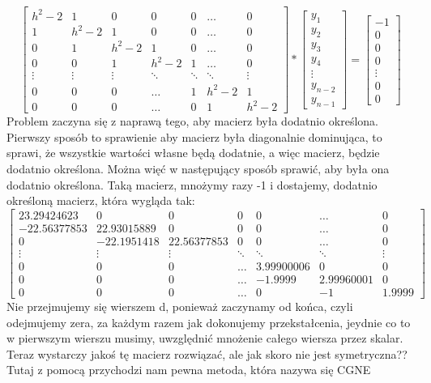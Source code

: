 \documentclass[12pt]{article}
\begin{document}
\[
\begin{bmatrix}
    h^{2}-2 & 1 & 0 & 0 & 0 & \dots & 0\\
    1 & h^{2}-2 & 1 & 0 & 0 & \dots & 0\\ 
    0 & 1 & h^{2}-2 & 1 & 0 & \dots & 0\\
    0 & 0 & 1 & h^{2}-2 & 1 &\dots & 0\\
    \vdots & \vdots & \vdots & \ddots & \ddots & \ddots & \vdots\\
    0 & 0 & 0 & \hdots & 1 & h^{2}-2 & 1\\
    0 & 0 & 0 & \hdots & 0 & 1 & h^{2}-2
\end{bmatrix}
*
\begin{bmatrix}
    y_{1}\\
    y_{2}\\
    y_{3}\\
    y_{4}\\
    \vdots\\
    y_{n-2}\\
    y_{n-1}
\end{bmatrix}
=
\begin{bmatrix}
    -1\\
    0\\
    0\\
    0\\
    \vdots\\
    0\\
    0
\end{bmatrix}
\]
Problem zaczyna się z naprawą tego, aby macierz była dodatnio określona. Pierwszy sposób to sprawienie aby macierz była diagonalnie dominująca, to sprawi, że wszystkie wartości własne będą dodatnie, a więc macierz, będzie dodatnio określona. Można więć w następujący sposób sprawić, aby była ona dodatnio określona. Taką macierz, mnożymy razy -1 i dostajemy, dodatnio określoną macierz, która wygląda tak: 
\[
\begin{bmatrix}
    23.29424623 & 0 & 0 & 0 & 0 & \dots & 0\\
    -22.56377853 & 22.93015889 & 0 & 0 & 0 & \dots & 0\\ 
    0 & -22.1951418 & 22.56377853 & 0 & 0 & \dots & 0\\
    \vdots & \vdots & \vdots & \ddots & \ddots & \ddots & \vdots\\
    0 & 0 & 0 & \hdots & 3.99900006 & 0 & 0\\
    0 & 0 & 0 & \hdots & -1.9999 & 2.99960001 & 0\\
    0 & 0 & 0 & \hdots & 0 & -1 & 1.9999
\end{bmatrix}
\]
Nie przejmujemy się wierszem d, ponieważ zaczynamy od końca, czyli odejmujemy zera, za każdym razem jak dokonujemy przekstałcenia, jeydnie co to w pierwszym wierszu musimy, uwzględnić mnożenie całego wiersza przez skalar. Teraz wystarczy jakoś tę macierz rozwiązać, ale jak skoro nie jest symetryczna?? Tutaj z pomocą przychodzi nam pewna metoda, która nazywa się CGNE
\end{document}
